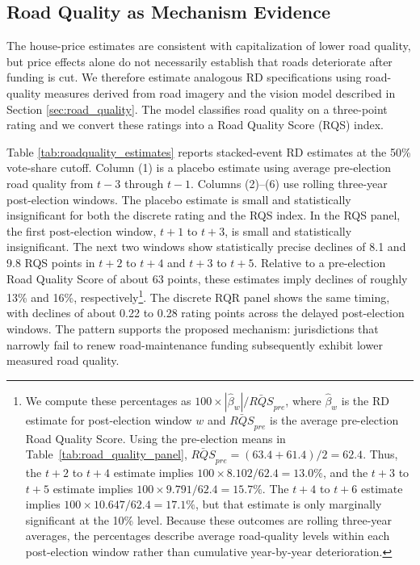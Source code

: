 \subsection{Road Quality as Mechanism Evidence} \label{sec:road_quality_decline}

The house-price estimates are consistent with capitalization of lower road quality, but price effects alone do not necessarily establish that roads deteriorate after funding is cut. We therefore estimate analogous RD specifications using road-quality measures derived from road imagery and the vision model described in Section \ref{sec:road_quality}. The model classifies road quality on a three-point rating and we convert these ratings into a Road Quality Score (RQS) index.



Table \ref{tab:roadquality_estimates} reports stacked-event RD estimates at the 50\% vote-share cutoff. Column (1) is a placebo estimate using average pre-election road quality from $t-3$ through $t-1$. Columns (2)--(6) use rolling three-year post-election windows. The placebo estimate is small and statistically insignificant for both the discrete rating and the RQS index. In the RQS panel, the first post-election window, $t+1$ to $t+3$, is small and statistically insignificant. The next two windows show statistically precise declines of 8.1 and 9.8 RQS points in $t+2$ to $t+4$ and $t+3$ to $t+5$. Relative to a pre-election Road Quality Score of about 63 points, these estimates imply declines of roughly 13\% and 16\%, respectively\footnote{We compute these percentages as $100 \times |\hat{\beta}_w| / \bar{RQS}_{pre}$, where $\hat{\beta}_w$ is the RD estimate for post-election window $w$ and $\bar{RQS}_{pre}$ is the average pre-election Road Quality Score. Using the pre-election means in Table~\ref{tab:road_quality_panel}, $\bar{RQS}_{pre}=(63.4+61.4)/2=62.4$. Thus, the $t+2$ to $t+4$ estimate implies $100 \times 8.102/62.4=13.0\%$, and the $t+3$ to $t+5$ estimate implies $100 \times 9.791/62.4=15.7\%$. The $t+4$ to $t+6$ estimate implies $100 \times 10.647/62.4=17.1\%$, but that estimate is only marginally significant at the 10\% level. Because these outcomes are rolling three-year averages, the percentages describe average road-quality levels within each post-election window rather than cumulative year-by-year deterioration.}. The discrete RQR panel shows the same timing, with declines of about 0.22 to 0.28 rating points across the delayed post-election windows.
The pattern supports the proposed mechanism: jurisdictions that narrowly fail to renew road-maintenance funding subsequently exhibit lower measured road quality.

